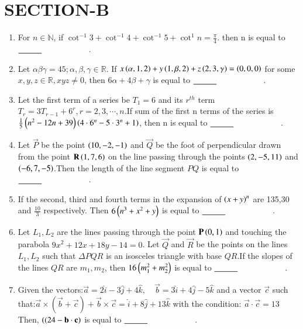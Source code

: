 \documentclass[journal,12pt,onecolumn]{IEEEtran}
\theoremstyle{remark}
\begin{document}
    \section{SECTION-B}
    \begin{enumerate}
        \item For $n \in \mathbb{N}$, if $\cot^{-1}3+\cot^{-1}4+\cot^{-1}5+\cot^{1}n=\frac{\pi}{4}$. then n is equal to $\makebox[3cm][l]{\underline{\hspace{1cm}}}$.
        \item Let $\alpha\beta\gamma=45;\alpha,\beta,\gamma \in \mathbb{R}$. If $x\left(\alpha,1,2\right)+y\left(1,\beta,2\right)+z\left(2,3,\gamma\right)=\left(0,0,0\right)$ for some $x,y,z \in \mathbb{R},xyz \neq 0$, then $6\alpha+4\beta+\gamma$ is equal to $\makebox[3cm][l]{\underline{\hspace{1cm}}}$.
        \item Let the first term of a series be $T_1=6$ and its $r^{th}$ term $T_r=3T_{r-1}+6^r,r=2,3,\cdots,n$.If sum of the first n terms of the series is $\frac{1}{5}\left(n^2-12n+39\right)\left(4\cdot6^n-5\cdot 3^n +1\right)$, then n is equal to $\makebox[3cm][l]{\underline{\hspace{1cm}}}$.
        \item Let $\vec{P}$ be the point $\left(10,-2,-1\right)$ and $\vec{Q}$ be the foot of perpendicular drawn from the point $\mathbf{R}\left(1,7,6\right)$ on the line passing through the points $\left(2,-5,11\right)$ and $\left(-6,7,-5\right)$.Then the length of the line segment $PQ$ is equal to $\makebox[3cm][l]{\underline{\hspace{1cm}}}$.
        \item If the second, third and fourth terms in the expansion of $\left(x+y\right)^n$ are 135,30 and $\frac{10}{3}$ respectively. Then $6\left(n^3+x^2+y\right)$ is equal to $\makebox[3cm][l]{\underline{\hspace{1cm}}}$.
        \item Let $L_1,L_2$ are the lines passing through the point $\mathbf{P}\left(0,1\right)$ and touching the parabola $9x^2+12x+18y-14=0$. Let $\vec{Q}$ and $\vec{R}$ be the points on the lines $L_1,L_2$ such that $\Delta PQR$ is an isosceles triangle with base $QR$.If the slopes of the lines $QR$ are $m_1,m_2$, then $16\left(m_1^2+m_2^2\right)$ is equal to $\makebox[3cm][l]{\underline{\hspace{1cm}}}$.
        \item Given the vectors:$\vec{a} = 2\hat{i} - 3\hat{j} + 4\hat{k}, \quad \vec{b} = 3\hat{i} + 4\hat{j} - 5\hat{k}$ and a vector $\vec{c}$ such that:$\vec{a} \times (\vec{b} + \vec{c}) + \vec{b} \times \vec{c} = \hat{i} + 8\hat{j} + 13\hat{k}$ with the condition: $\vec{a} \cdot \vec{c} = 13$ Then,  $\left(( 24 - \mathbf{b} \cdot \mathbf{c} \right)$ is equal to $\makebox[3cm][l]{\underline{\hspace{1cm}}}$.

\end{enumerate}
\end{document}
